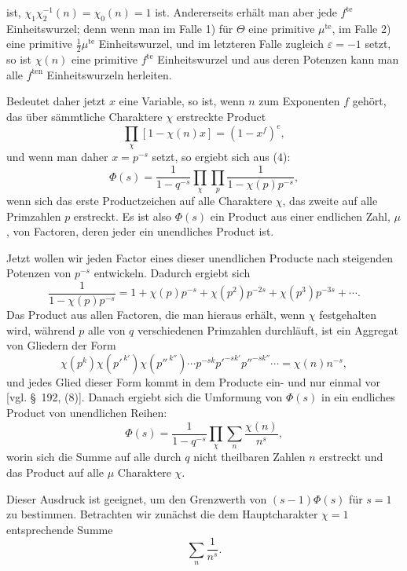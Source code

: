 \documentclass[11pt]{article}
\begin{document}
ist, $\chi_1\chi_2^{-1}(n)=\chi_0(n)=1$ ist. Andererseits erhält man aber jede $f^{\mathrm{te}}$ Einheitswurzel; denn wenn man im Falle 1) für $\Theta$ eine primitive $\mu^{\mathrm{te}}$, im Falle 2) eine primitive $\frac12\mu^{\mathrm{te}}$ Einheitswurzel, und im letzteren Falle zugleich $\varepsilon=-1$ setzt, so ist $\chi(n)$ eine primitive $f^{\mathrm{te}}$ Einheitswurzel und aus deren Potenzen kann man alle $f^{\mathrm{ten}}$ Einheitswurzeln herleiten.

Bedeutet daher jetzt $x$ eine Variable, so ist, wenn $n$ zum Exponenten $f$ gehört, das über sämmtliche Charaktere $\chi$ erstreckte Product
\begin{equation}
\prod_\chi[1-\chi(n)x]=(1-x^f)^e,
\tag{9}
\end{equation}
und wenn man daher $x=p^{-s}$ setzt, so ergiebt sich aus (4):
\begin{equation}
\Phi(s)=\frac1{1-q^{-s}}\prod_\chi\prod_p\frac1{1-\chi(p)p^{-s}},
\tag{10}
\end{equation}
wenn sich das erste Productzeichen auf alle Charaktere $\chi$, das zweite auf alle Primzahlen $p$ erstreckt. Es ist also $\Phi(s)$ ein Product aus einer endlichen Zahl, $\mu$, von Factoren, deren jeder ein unendliches Product ist.

Jetzt wollen wir jeden Factor eines dieser unendlichen Producte nach steigenden Potenzen von $p^{-s}$ entwickeln. Dadurch ergiebt sich
\[
\frac1{1-\chi(p)p^{-s}}
=1+\chi(p)p^{-s}+\chi(p^2)p^{-2s}+\chi(p^3)p^{-3s}+\cdots .
\]
Das Product aus allen Factoren, die man hieraus erhält, wenn $\chi$ festgehalten wird, während $p$ alle von $q$ verschiedenen Primzahlen durchläuft, ist ein Aggregat von Gliedern der Form
\[
\chi(p^k)\chi(p'^{\,k'})\chi(p''^{\,k''})\cdots p^{-sk}p'^{-sk'}p''^{-sk''}\cdots
=\chi(n)n^{-s},
\]
und jedes Glied dieser Form kommt in dem Producte ein- und nur einmal vor [vgl. \S~192, (8)]. Danach ergiebt sich die Umformung von $\Phi(s)$ in ein endliches Product von unendlichen Reihen:
\begin{equation}
\Phi(s)=\frac1{1-q^{-s}}\prod_\chi\sum_n\frac{\chi(n)}{n^s},
\tag{11}
\end{equation}
worin sich die Summe auf alle durch $q$ nicht theilbaren Zahlen $n$ erstreckt und das Product auf alle $\mu$ Charaktere $\chi$.

Dieser Ausdruck ist geeignet, um den Grenzwerth von $(s-1)\Phi(s)$ für $s=1$ zu bestimmen. Betrachten wir zunächst die dem Hauptcharakter $\chi=1$ entsprechende Summe
\[
\sum_n\frac1{n^s}.
\]
\end{document}
